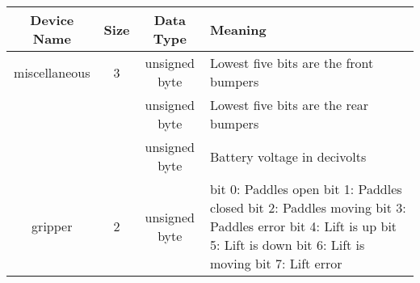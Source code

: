 \documentclass[11pt]{article}
\begin{document}
\begin{table}
\begin{center}
{\small
\begin{tabularx}{\columnwidth}{|c|c|c|X|}
\hline
Device Name & Size & Data Type & Meaning \\
\hline
miscellaneous & 3 & unsigned byte & Lowest five bits are the front bumpers \\
& & unsigned byte & Lowest five bits are the rear bumpers \\
& & unsigned byte & Battery voltage in decivolts \\
\hline
gripper & 2 & unsigned byte & bit 0: Paddles open \newline
bit 1: Paddles closed\newline
bit 2: Paddles moving\newline
bit 3: Paddles error\newline
bit 4: Lift is up\newline
bit 5: Lift is down\newline
bit 6: Lift is moving\newline
bit 7: Lift error \\


\end{tabularx}}
\end{center}
\end{table}
\end{document}
